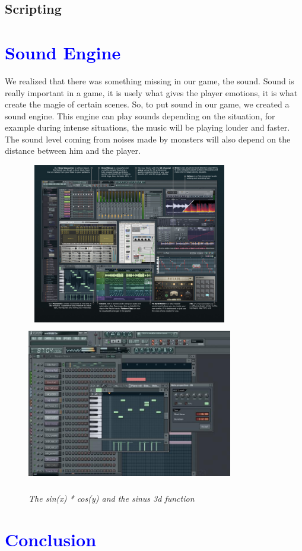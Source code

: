 \documentclass[article]{report}         %
\begin{document}
      \section{Scripting}
    \chapter{\textcolor{blue}{Sound Engine}}
	We realized that there was something missing in our game, the sound. Sound is really important in a game, it is usely what gives the player emotions, it is what create the magie of certain scenes.
	So, to put sound in our game, we created a sound engine. This engine can play sounds depending on the situation, for example during intense situations, the music will be playing louder and faster. The sound level coming from noises made by monsters will also depend on the distance between him and the player.
	
		\begin{figure}[h]
				\includegraphics[width=9cm, height=7cm]{images/FLStudio/1.JPG}
				\includegraphics[width=9cm, height=7cm]{images/FLStudio/2.JPG}
				\begin{center}\it The sin(x) * cos(y) and the sinus 3d function\end{center}
			\end{figure}
	
    \chapter{\textcolor{blue}{Conclusion}}
    
\end{document}
